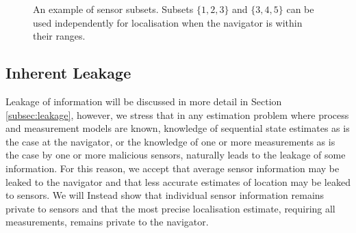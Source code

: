 \documentclass[10pt,journal,compsoc]{IEEEtran}
\theoremstyle{definition}
\theoremstyle{definition}
\theoremstyle{remark}
\begin{document}
\begin{figure}[htbp]
\caption{An example of sensor subsets. Subsets $\{1,2,3\}$ and $\{3,4,5\}$ can be used independently for localisation when the navigator is within their ranges.}
\label{fig:sensor_subsets}
\end{figure}

% 
% 

\subsection{Inherent Leakage}
Leakage of information will be discussed in more detail in Section \ref{subsec:leakage}, however, we stress that in any estimation problem where process and measurement models are known, knowledge of sequential state estimates as is the case at the navigator, or the knowledge of one or more measurements as is the case by one or more malicious sensors, naturally leads to the leakage of some information. For this reason, we accept that average sensor information may be leaked to the navigator and that less accurate estimates of location may be leaked to sensors. We will Instead show that individual sensor information remains private to sensors and that the most precise localisation estimate, requiring all measurements, remains private to the navigator. 
\end{document}
